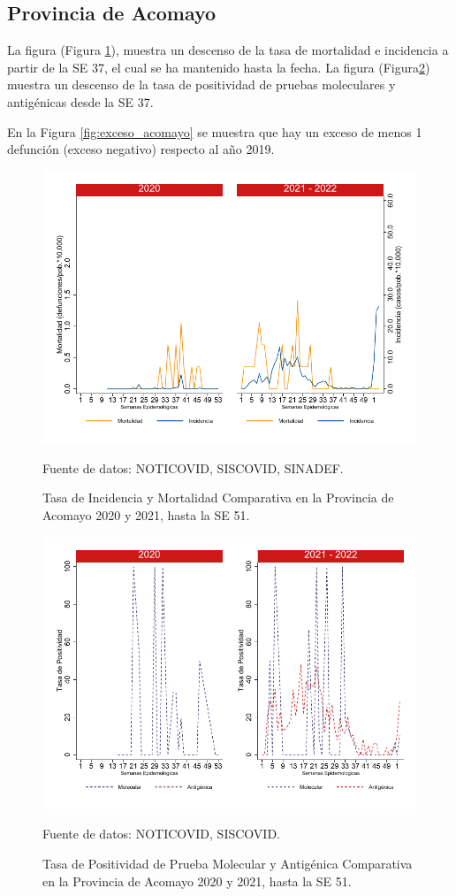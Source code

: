 \documentclass[12pt,a4paper,openany]{book}
\begin{document}
		\subsection*{Provincia de Acomayo}
		\noindent La figura (Figura \ref{fig:inc_mort_acomayo}),  muestra un descenso de la tasa de mortalidad e incidencia a partir de la SE 37, el cual se ha mantenido hasta la fecha. 
		\noindent La figura (Figura\ref{fig:positividad_acomayo}) muestra un descenso de la tasa de positividad de pruebas moleculares y antigénicas desde la SE 37.
		
		 En la Figura \ref{fig:exceso_acomayo} se muestra que hay un exceso de menos 1 defunción (exceso negativo) respecto al año 2019.
		
		\begin{figure}[h]
			\caption{Tasa de Incidencia y Mortalidad Comparativa en la Provincia de Acomayo 2020 y 2021, hasta la SE 51.}\label{fig:inc_mort_acomayo}
			\begin{center}
				\includegraphics[width=0.65\linewidth]{../figuras/incidencia_mortalidad_20_21_1}
			\end{center}
			{\footnotesize {Fuente de datos: NOTICOVID, SISCOVID, SINADEF.}}
		\end{figure}
		
		\begin{figure}[h]
			\caption{Tasa de Positividad de Prueba Molecular y Antigénica Comparativa en la Provincia de Acomayo 2020 y 2021, hasta la SE 51. }\label{fig:positividad_acomayo}
			\begin{center}
				\includegraphics[width=0.7\linewidth]{../figuras/positividad_20_21_1}
			\end{center}
			{\footnotesize {Fuente de datos: NOTICOVID, SISCOVID.}}
		\end{figure}
		
\end{document}

